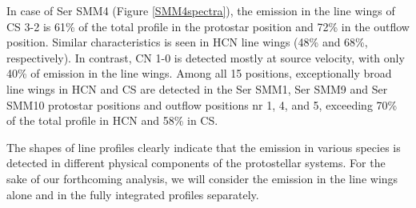 \documentclass{aa}
\begin{document}
In case of Ser SMM4 (Figure \ref{SMM4spectra}), the emission in the line wings
of CS 3-2 is 61\% of the total profile 
in the protostar position and 72\% in the outflow position. Similar characteristics is 
seen in HCN line wings (48\% and 68\%, respectively). In contrast, CN 1-0 is detected 
mostly at source velocity, with only 40\% of emission in the line wings. Among all 15
positions, exceptionally broad line wings in HCN and CS are detected in 
the Ser SMM1, Ser SMM9 and Ser SMM10 protostar positions and outflow positions 
nr 1, 4, and 5, exceeding 70\% of the total profile in HCN and 58\% in CS.

The shapes of line profiles clearly indicate that the emission in various species is 
detected in different physical components of the protostellar systems. For the sake 
of our forthcoming analysis, we will consider the emission in the line wings alone and in 
the fully integrated profiles separately.

\end{document}
